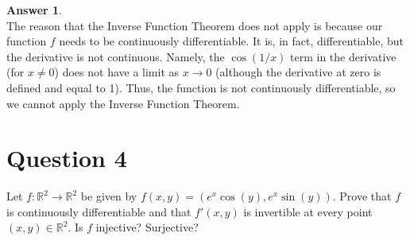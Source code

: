 \documentclass[10pt,a4paper]{article}
\theoremstyle{definition}
\newtheorem*{answer*}{Answer}
\theoremstyle{definition}
\numberwithin{equation}{section}
\begin{document}
\begin{answer*}$ $
\\The reason that the Inverse Function Theorem does not apply is because our function $f$ needs to be continuously differentiable. It is, in fact, differentiable, but the derivative is not continuous. Namely, the $\cos(1/x)$ term in the derivative (for $x \neq 0$) does not have a limit as $x \to 0$ (although the derivative at zero is defined and equal to 1). Thus, the function is not continuously differentiable, so we cannot apply the Inverse Function Theorem. 
\end{answer*}


\section*{Question 4}
Let $f: \mathbb{R}^2 \to \mathbb{R}^2$ be given by $f(x, y) = (e^x \cos(y), e^x \sin(y))$. Prove that $f$ is continuously differentiable and that $f'(x, y)$ is invertible at every point $(x, y) \in \mathbb{R}^2$. Is $f$ injective? Surjective?
\end{document}
